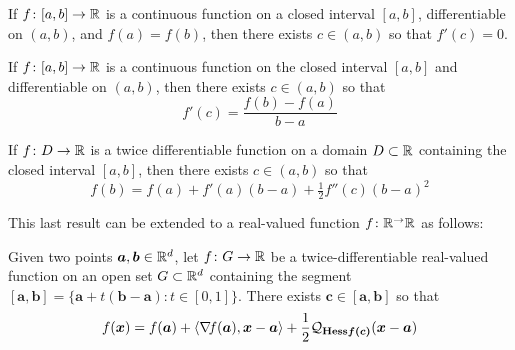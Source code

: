
\begin{theorem}\label{theorem:Rolle}
If $f\colon [a,b] \to \mathbb{R}$ is a continuous function on a closed interval $[a,b]$, differentiable on $(a,b)$, and $f(a) = f(b)$, then there exists $c \in (a,b)$ so that $f'(c)=0$.
\end{theorem}

\begin{theorem}\label{theorem:MVT}
If $f\colon [a,b] \to \mathbb{R}$ is a continuous function on the closed interval $[a,b]$ and differentiable on $(a,b)$, then there exists $c \in (a,b)$ so that
\begin{equation*}
f'(c) = \frac{f(b)-f(a)}{b-a}
\end{equation*}
\end{theorem}

\begin{theorem}
If $f\colon D \to \mathbb{R}$ is a twice differentiable function on a domain $D \subset \mathbb{R}$ containing the closed interval $[a,b]$, then there exists $c \in (a,b)$ so that 
\begin{equation*}
f(b) = f(a) + f'(a)(b-a) + \tfrac{1}{2}f''(c)(b-a)^2
\end{equation*}
\end{theorem}

This last result can be extended to a real-valued function $f \colon \mathbb{R}^ \to \mathbb{R}$ as follows:

\begin{theorem}[Taylor]\label{theorem:Taylor}
Given two points $\boldsymbol{a}, \boldsymbol{b} \in \mathbb{R}^d$, let $f\colon G \to \mathbb{R}$ be a twice-differentiable real-valued function on an open set $G \subset \mathbb{R}^d$ containing the segment $[\boldsymbol{a}, \boldsymbol{b}] = \{ \boldsymbol{a} + t (\boldsymbol{b} - \boldsymbol{a}) : t \in [0,1] \}$.  There exists $\boldsymbol{c} \in [\boldsymbol{a}, \boldsymbol{b}]$ so that 
\begin{equation*}
f(\boldsymbol{x}) = f(\boldsymbol{a}) + \langle \mathop{\nabla\! {f}}(\boldsymbol{a}), \boldsymbol{x} - \boldsymbol{a} \rangle + \frac{1}{2} \mathcal{Q}_{\boldsymbol{\mathop{\mathrm{Hess}{f}}(c)}} (\boldsymbol{x}-\boldsymbol{a})
\end{equation*}
\end{theorem}


